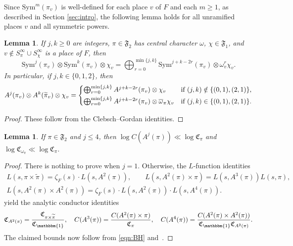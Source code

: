\documentclass[11pt]{amsart}
\newtheorem{lemma}[theorem]{Lemma}
\theoremstyle{remark}
\newcommand{\Sym}{\mathrm{Sym}}
\renewcommand{\bar}{\overline}
\renewcommand{\tilde}{\widetilde}
\numberwithin{equation}{section}
\begin{document}
Since $\Sym^m(\pi_v)$ is well-defined for each place $v$ of $F$ and each $m\geq 1$, as described in Section \ref{sec:intro}, the following lemma holds for all unramified places $v$ and all symmetric powers.

\begin{lemma}
\label{lem:CG}
If $j,k\geq 0$ are integers, $\pi\in\mathfrak{F}_{2}$ has central character $\omega$, $\chi\in\mathfrak{F}_1$, and $v\notin S_{\pi}^{\infty}\cup S_{\chi}^{\infty}$ is a place of $F$, then
\[
\mathrm{Sym}^{j}(\pi_v)\otimes\mathrm{Sym}^k(\pi_v)\otimes\chi_v=\bigoplus_{r=0}^{\min\{j,k\}}\mathrm{Sym}^{j+k-2r}(\pi_v)\otimes\omega_{v}^{r}\chi_v.
\]
In particular, if $j,k\in\{0,1,2\}$, then
\[
A^j(\pi_v)\otimes A^k(\widetilde{\pi}_v)\otimes\chi_v = \begin{cases}
\bigoplus_{r=0}^{\min\{j,k\}} A^{j+k-2r}(\pi_v)\otimes\chi_v&\mbox{if $(j,k)\notin\{(0,1),(2,1)\}$,}\vspace{1mm}\\
\bigoplus_{r=0}^{\min\{j,k\}} A^{j+k-2r}(\pi_v)\otimes \bar{\omega}_{\pi}\chi_v&\mbox{if $(j,k)\in\{(0,1),(2,1)\}$.}
\end{cases}
\]
\end{lemma}
\begin{proof}
	These follow from the Clebsch--Gordan identities.
\end{proof}

\begin{lemma}
\label{lem:AC}
If $\pi\in\mathfrak{F}_2$ and $j\leq 4$, then $\log C(A^j(\pi))\ll \log \mathfrak{C}_{\pi}$ and $\log \mathfrak{C}_{\omega_{\pi}}\ll \log \mathfrak{C}_{\pi}$.
\end{lemma}
\begin{proof}
There is nothing to prove when $j=1$.  Otherwise, the $L$-function identities
\begin{equation*}
\begin{gathered}
L(s,\pi\times\tilde{\pi})=\zeta_F(s)\cdot L(s,A^2(\pi)),\qquad L(s,A^2(\pi)\times\pi) = L(s,A^3(\pi))L(s,\pi),\\
L(s,A^2(\pi)\times A^2(\pi))=\zeta_F(s)\cdot L(s,A^2(\pi))\cdot L(s,A^4(\pi)).
\end{gathered}
\end{equation*}
yield the analytic conductor identities
\[
\mathfrak{C}_{A^2(\pi)}=\frac{\mathfrak{C}_{\pi\times\tilde{\pi}}}{\mathfrak{C}_{\mathbbm{1}}},\quad C(A^3(\pi))=\frac{C(A^2(\pi)\times\pi)}{\mathfrak{C}_{\pi}},\quad C(A^4(\pi))=\frac{C(A^2(\pi)\times A^2(\pi))}{\mathfrak{C}_{\mathbbm{1}}\mathfrak{C}_{A^2(\pi)}}.
\]
The claimed bounds now follow from \eqref{eqn:BH} and~\cite[Theorem A]{RamakrishnanYang}.
\end{proof}
\end{document}
